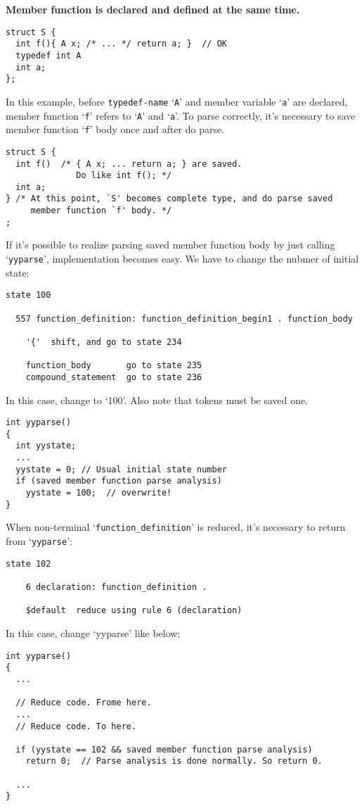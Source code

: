 \documentclass{article}
\begin{document}
\large
{\bf{Member function is declared and defined at the same time.}}
\normalsize

\begin{verbatim}
struct S {
  int f(){ A x; /* ... */ return a; }  // OK
  typedef int A
  int a;
};
\end{verbatim}
In this example,
before {\tt{typedef-name}} `{\tt{A}}' and member variable `{\tt{a}}'
are declared, member function `{\tt{f}}' refers to `{\tt{A}}' and
`{\tt{a}}'. To parse correctly, it's necessary to save member
function `{\tt{f}}' body once and after do parse.

\begin{verbatim}
struct S {
  int f()  /* { A x; ... return a; } are saved.
              Do like int f(); */
  int a;
} /* At this point, `S' becomes complete type, and do parse saved
     member function `f' body. */
;
\end{verbatim}
If it's possible to realize parsing saved member function body
by just calling `{\tt{yyparse}}', implementation becomes easy.
We have to change the nubmer
of initial state:
\begin{verbatim}
state 100

  557 function_definition: function_definition_begin1 . function_body

    '{'  shift, and go to state 234

    function_body       go to state 235
    compound_statement  go to state 236
\end{verbatim}
In this case, change to `100'. Also note that tokens must be
saved one.
\begin{verbatim}
int yyparse()
{
  int yystate;
  ...
  yystate = 0; // Usual initial state number
  if (saved member function parse analysis)
    yystate = 100;  // overwrite!
}
\end{verbatim}
When non-terminal `{\tt{function\_definition}}' is reduced,
it's necessary to return from `{\tt{yyparse}}':
\begin{verbatim}
state 102

    6 declaration: function_definition .

    $default  reduce using rule 6 (declaration)
\end{verbatim}
In this case, change `yyparse' like below:
\begin{verbatim}
int yyparse()
{
  ...

  // Reduce code. Frome here.
  ...
  // Reduce code. To here.

  if (yystate == 102 && saved member function parse analysis)
    return 0;  // Parse analysis is done normally. So return 0.

  ...
} 
\end{verbatim}
\end{document}
